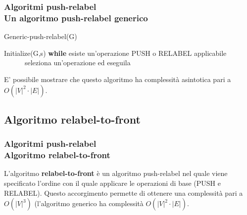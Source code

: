 \documentclass{beamer}
\begin{document}
\begin{frame}
\frametitle{Algoritmi push-relabel\\Un algoritmo push-relabel generico}
\begin{algorithm}[H]
    \caption{Generic-push-relabel(G)}%
    \begin{algorithmic}[1]
        \State Initialize(G,s)
        \State \textbf{while} esiste un'operazione PUSH o RELABEL applicabile
        \State \ \ \ \ \ \ seleziona un'operazione ed eseguila
    \end{algorithmic}
    \label{alg_1}
\end{algorithm}
E' possibile mostrare che questo algoritmo ha complessità asintotica pari a $O(|V|^2\cdot|E|)$.
\end{frame}

\subsection{Algoritmo relabel-to-front}
\begin{frame}
\frametitle{Algoritmi push-relabel\\Algoritmo relabel-to-front}
L'algoritmo \textbf{relabel-to-front} è un algoritmo push-relabel nel quale viene specificato l'ordine con il quale applicare le operazioni di base (PUSH e RELABEL). Questo accorgimento permette di ottenere una complessità pari a $O(|V|^3)$ (l'algoritmo generico ha complessità $O(|V|^2\cdot|E|)$.
\end{frame}
\end{document}
